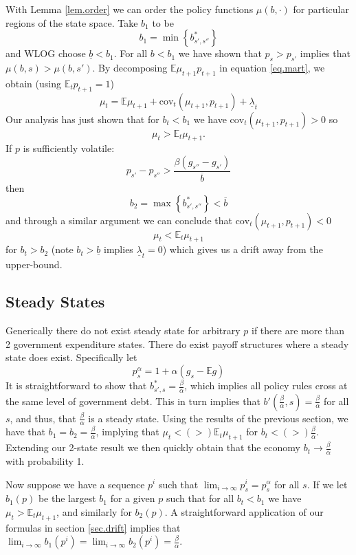 \documentclass[12pt]{article}
\newcommand{\EE}{\mathbb E}
\newcommand{\cov}{{\text{cov}}}
\begin{document}
With Lemma \ref{lem.order} we can order the policy functions $\mu(b,\cdot)$ for particular regions of the state space.  Take $b_1$ to be
\[
	b_1 = \min\left\{b^*_{s',s''}\right\}
\] and WLOG choose $\underline b < b_1$.  For all $b < b_1$ we have shown that $p_s > p_{s'}$ implies that $\mu(b,s) > \mu(b,s')$.  By decomposing $\EE \mu_{t+1}p_{t+1}$ in equation \eqref{eq.mart}, we obtain (using $\EE_t p_{t+1} = 1$)
\begin{equation}
	\mu_t = \EE\mu_{t+1} +\cov_t(\mu_{t+1},p_{t+1}) + \underline \lambda_t
\end{equation}Our analysis has just shown that for $b_t < b_1$ we have $\cov_t (\mu_{t+1},p_{t+1})  >0$ so 
\[
	\mu_t > \EE_t\mu_{t+1}.
\]  If $p$ is sufficiently volatile:
\[
	p_{s'} - p_{s''} > \frac{\beta(g_{s''}-g_{s'})}{\overline b}
\] then 
\[
	b_2 = \max\left\{b^*_{s',s''}\right\} <\overline b
\] and through a similar argument  we can conclude that $\cov_t(\mu_{t+1},p_{t+1}) < 0$ 
\[
	\mu_t < \EE_t \mu_{t+1}
\] for $b_t > b_2$ (note $b_t >\underline b$ implies $\underline \lambda_t =0$) which gives us a drift away from the upper-bound. 
\subsection{Steady States}  Generically there do not exist steady state for arbitrary $p$ if there are more than 2 government expenditure states.  There do exist payoff structures where a steady state does exist.  Specifically let
\[
	p^\alpha_s = 1 + \alpha(g_s - \EE g)
\]It is straightforward to show that $b^*_{s',s} = \frac\beta\alpha$, which implies all policy rules cross at the same level of government debt.  This in turn implies that $b'(\frac\beta\alpha,s) = \frac\beta\alpha$ for all $s$, and thus, that $\frac\beta\alpha$ is a steady state.  Using the results of the previous section, we have that $b_1 = b_2 = \frac\beta\alpha$, implying that $\mu_t < (>) \EE_t\mu_{t+1}$ for $b_t  < (>) \frac\beta\alpha$.  Extending our 2-state result we then quickly obtain that the economy $b_t \rightarrow \frac\beta\alpha$ with probability 1.

Now suppose we have a sequence $p^i$ such that $\lim_{i\rightarrow\infty} p^i_s = p^\alpha_s$ for all $s$.  If we let $b_1(p)$ be the largest $b_1$ for a given $p$ such that for all $b_t < b_1$ we have $\mu_t > \EE_t\mu_{t+1}$, and similarly for $b_2(p)$.  A straightforward application of our formulas in section \ref{sec.drift} implies that $\lim_{i\rightarrow \infty} b_1(p^i) = \lim_{i\rightarrow\infty} b_2(p^i) = \frac\beta\alpha$.
\end{document}
